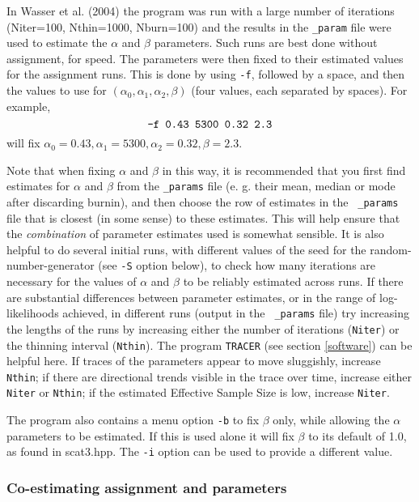 \documentclass[10pt,titlepage,times,letterpaper]{article}
\begin{document}
In Wasser et al. (2004)
the program was run with a large number of iterations ({Niter=100, Nthin=1000,
Nburn=100}) and the results in the {\tt \_param} file were used to estimate
the $\alpha$ and $\beta$ parameters.  Such runs are best done without assignment,
for speed.  The parameters were then fixed to their estimated values for the
assignment runs.  This is done by using
{\tt -f}, followed by a space, and then the values
to use for $(\alpha_0,\alpha_1,\alpha_2,\beta)$ (four values, each
separated by spaces).  
For example,
$$\text{\tt -f 0.43 5300 0.32 2.3}$$ will fix $\alpha_0 = 0.43, \alpha_1 =
5300, \alpha_2 = 0.32, \beta = 2.3$.

Note that when fixing $\alpha$ and $\beta$ in this way, it
is recommended that you first find estimates for $\alpha$ and $\beta$
from the {\tt \_params} file (e. g. their mean, median or mode after
discarding burnin), and then choose the row of estimates in the {\tt
\_params} file that is closest (in some sense) to these
estimates. This will help ensure that the {\it combination} of
parameter estimates used is somewhat sensible.
It is also helpful to do
several initial runs, with different values of the seed for the
random-number-generator (see {\tt -S} option below), to check how many
iterations are necessary for the values of $\alpha$ and $\beta$ to be
reliably estimated across runs. 
If there are
substantial differences between parameter estimates, or in the range
of log-likelihoods achieved, in different runs (output in the {\tt
\_params} file) try increasing the lengths of the runs by increasing
either the number of iterations ({\tt Niter}) or the thinning interval
({\tt Nthin}).  The program {\tt TRACER} (see section \ref{software}) can be
helpful here.  If traces of the parameters appear to move sluggishly,
increase {\tt Nthin}; if there are directional trends visible in the
trace over time, increase either {\tt Niter} or {\tt Nthin}; if the
estimated Effective Sample Size is low, increase {\tt Niter}.

The program also contains a menu option {\tt -b} to fix $\beta$ only,
while allowing the $\alpha$ parameters to be estimated.  If this is
used alone it will fix $\beta$ to its default of 1.0, as found in
scat3.hpp.  The {\tt -i} option can be used to provide a different
value. 

\subsubsection{Co-estimating assignment and parameters}
\end{document}
